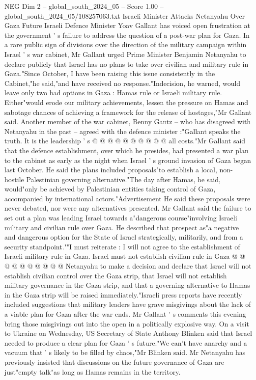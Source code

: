 \begin{textsample}{NEG Dim 2 – global\_south\_2024\_05 – Score 1.00 – global\_south\_2024\_05/108257063.txt}  \label{ex:f2_neg_378}
Israeli Minister Attacks Netanyahu Over Gaza Future Israeli Defence Minister Yoav Gallant has voiced open frustration at the government ' s failure to address the question of a post-war plan for Gaza.
In a rare public sign of divisions over the direction of the military campaign within Israel ' s war cabinet, Mr Gallant urged Prime Minister Benjamin Netanyahu to declare publicly that Israel has no plans to take over civilian and military rule in Gaza."Since October, I have been raising this issue consistently in the Cabinet,"he said,"and have received no response."Indecision, he warned, would leave only two bad options in Gaza : Hamas rule or Israeli military rule.
Either"would erode our military achievements, lessen the pressure on Hamas and sabotage chances of achieving a framework for the release of hostages,"Mr Gallant said.
Another member of the war cabinet, Benny Gantz -- who has disagreed with Netanyahu in the past -- agreed with the defence minister :"Gallant speaks the truth.
It is the leadership ' s @ @ @ @ @ @ @ @ @ @ all costs."Mr Gallant said that the defence establishment, over which he presides, had presented a war plan to the cabinet as early as the night when Israel ' s ground invasion of Gaza began last October.
He said the plans included proposals"to establish a local, non-hostile Palestinian governing alternative."The day after Hamas, he said, would"only be achieved by Palestinian entities taking control of Gaza, accompanied by international actors."Advertisement He said these proposals were never debated, nor were any alternatives presented.
Mr Gallant said the failure to set out a plan was leading Israel towards a"dangerous course"involving Israeli military and civilian rule over Gaza.
He described that prospect as"a negative and dangerous option for the State of Israel strategically, militarily, and from a security standpoint.""I must reiterate : I will not agree to the establishment of Israeli military rule in Gaza.
Israel must not establish civilian rule in Gaza @ @ @ @ @ @ @ @ @ @ Netanyahu to make a decision and declare that Israel will not establish civilian control over the Gaza strip, that Israel will not establish military governance in the Gaza strip, and that a governing alternative to Hamas in the Gaza strip will be raised immediately."Israeli press reports have recently included suggestions that military leaders have grave misgivings about the lack of a viable plan for Gaza after the war ends.
Mr Gallant ' s comments this evening bring those misgivings out into the open in a politically explosive way.
On a visit to Ukraine on Wednesday, US Secretary of State Anthony Blinken said that Israel needed to produce a clear plan for Gaza ' s future."We can't have anarchy and a vacuum that ' s likely to be filled by chaos,"Mr Blinken said.
Mr Netanyahu has previously insisted that discussions on the future governance of Gaza are just"empty talk"as long as Hamas remains in the territory.

\end{textsample}
